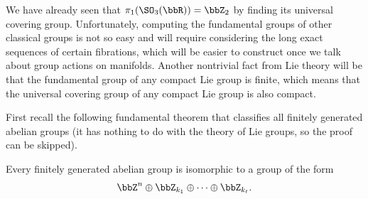 We have already seen that $\pi_1(\SO_3(\bbR))=\bbZ_2$ by finding its universal covering group. Unfortunately, computing the fundamental groups of other classical groups is not so easy and will require considering the long exact sequences of certain fibrations, which will be easier to construct once we talk about group actions on manifolds. Another nontrivial fact from Lie theory will be that the fundamental group of any compact Lie group is finite, which means that the universal covering group of any compact Lie group is also compact.

First recall the following fundamental theorem that classifies all finitely generated abelian groups (it has nothing to do with the theory of Lie groups, so the proof can be skipped).

\begin{thm}\label{thm classification of finitely generated abelian gr}
    Every finitely generated abelian group is isomorphic to a group of the form
    \[\bbZ^n\oplus \bbZ_{k_1}\oplus \cdots\oplus \bbZ_{k_t}.\]
\end{thm}

